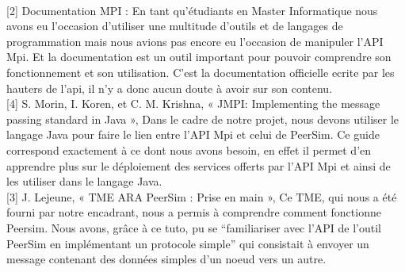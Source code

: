 \documentclass{article}
\begin{document}
		\\[2mm]
		[2] Documentation MPI : En tant qu’étudiants en Master Informatique nous avons eu l’occasion d’utiliser une multitude d’outils et de langages de programmation mais nous avions pas encore eu l’occasion de manipuler l’API Mpi. Et la documentation est un outil important pour pouvoir comprendre son fonctionnement et son utilisation. C’est la documentation officielle ecrite par les hauters de l'api, il n’y a donc aucun doute à avoir sur son contenu.
		\\[2mm]
		[4] S. Morin, I. Koren, et C. M. Krishna, « JMPI: Implementing the message passing standard in Java », Dans le cadre de notre projet, nous devons utiliser le langage Java pour faire le lien entre l’API Mpi et celui de PeerSim. Ce guide  correspond exactement à ce dont nous avons besoin, en effet il permet d’en apprendre plus sur le déploiement des services offerts par l’API Mpi et ainsi de les utiliser dans le langage Java.
		\\[2mm]
		 [3] J. Lejeune, « TME ARA PeerSim : Prise en main »,  Ce TME, qui nous a été fourni par notre encadrant, nous a permis à comprendre comment fonctionne Peersim. Nous avons, grâce à ce tuto, pu se “familiariser avec l’API de l’outil PeerSim en implémentant un protocole simple” qui consistait à envoyer un message contenant des données simples d’un noeud vers un autre.
\end{document}
